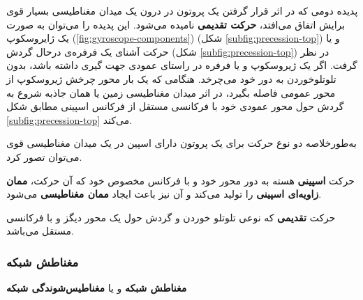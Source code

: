  
پدیده دومی که در اثر قرار گرفتن یک پروتون در درون یک میدان مغناطیسی بسیار قوی برایش اتفاق می‌افتد، \textbf{حرکت تقدیمی }نامیده می‌شود. این پدیده را می‌توان به صورت یک ژایروسکوپ 
(\ref{fig:gyroscope-components})
(شکل \ref{subfig:precession-top}) و یا حرکت آشنای یک فرفره‌ی درحال گردش (شکل \ref{subfig:precession-top})
در نظر گرفت. اگر یک ژیروسکوپ و یا فرفره در راستای عمودی جهت گیری داشته باشد، بدون تلوتلو‌خوردن
به دور خود می‌چرخد. هنگامی که یک بار محور چرخش ژیروسکوپ از محور عمومی فاصله بگیرد، در اثر میدان مغناطیسی زمین یا همان جاذبه
 شروع به گردش حول محور عمودی خود با فرکانسی مستقل از فرکانس اسپینی مطابق شکل \ref{subfig:precession-top}
می‌کند. 

به‌طور‌خلاصه دو نوع حرکت برای یک پروتون دارای اسپین در یک میدان مغناطیسی قوی می‌توان تصور کرد.

\begin{alphabetlist}
	\item
	حرکت \textbf{اسپینی} هسته به دور محور خود و با فرکانس مخصوص خود که آن حرکت، \textbf{ممان زاویه‌ای اسپینی }را تولید می‌کند و آن نیز باعث ایجاد \textbf{ممان مغناطیسی }می‌شود.
	\item
	حرکت \textbf{تقدیمی} که نوعی تلوتلو خوردن و  گردش حول یک محور دیگز و با فرکانسی مستقل می‌باشد.
\end{alphabetlist}


\subsubsection{مغناطش شبکه}
\textbf{مغناطش شبکه} و یا \textbf{مغناطیس‌شوندگی شبکه} 



\begin{figure}
	\centering
	\caption{}
	\label{fig:net-mag}
\end{figure}

